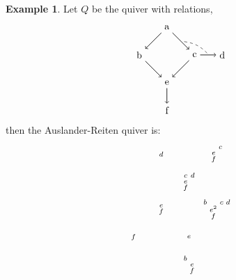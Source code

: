 \documentclass[11.5pt, twoside, a4paper, titlepage]{report}
\theoremstyle{definition}
\newtheorem{eg}[mydef]{Example}
\theoremstyle{plain}
\begin{document}
\begin{eg}
Let $Q$ be the quiver with relations, 
\begin{equation*}
\begin{tikzpicture}[->,-latex, auto, m path/.style={->, semithick}, every node/.style={}]
\node				(a) at (0,0)		{a};
\node 				(b) at (-1,-1)		{b};
\node 				(c) at (1,-1)		{c};
\node 				(d) at (2,-1)		{d};
\node 				(e) at (0,-2)		{e};
\node 				(f) at (0,-3)		{f};
\node 				(1) at (0.5,-0.5)	{};
\node 				(2) at (1.6,-1.1)	{};


\draw (a) [m path] edge (b);
\draw (a) [m path] edge (c);
\draw (b) [m path] edge (e);
\draw (c) [m path] edge (e);
\draw (c) [m path] edge (d);
\draw (e) [m path] edge (f);
\draw (1) [-, dashed] edge [bend left=20] (2);
\end{tikzpicture}
\end{equation*}
then the Auslander-Reiten quiver is:
\begin{equation*}
\begin{tikzpicture}[->,-latex, auto, main path/.style={->, semithick}, t path/.style={->, dashed, semithick}, every node/.style={}]
\node			(f) at (0,0)		{$\begin{smallmatrix}f\end{smallmatrix}$};
\node 			(d) at (1,3)	{$\begin{smallmatrix}d\end{smallmatrix}$};
\node 			(ef) at (1,1)		{$\begin{smallmatrix}e\\f  \end{smallmatrix}$};
\node			(cdef) at (2,2)		{$\begin{smallmatrix}c&d\\e&\\f&\end{smallmatrix}$};
\node 			(e) at (2,0)	{$\begin{smallmatrix} e \end{smallmatrix}$};
\node 			(bef) at (2,-1)	{$\begin{smallmatrix}b & \\ &e\\&f\end{smallmatrix}$};
\node 			(cef) at (3,3)	{$\begin{smallmatrix}&c\\e&\\f &\end{smallmatrix}$};
\node 			(bcde2f) at (3,1)	{$\begin{smallmatrix}b&&c&d\\&e^2&&\\&f&& \end{smallmatrix}$};

\end{tikzpicture}
\end{equation*}
\end{eg}
\end{document}
